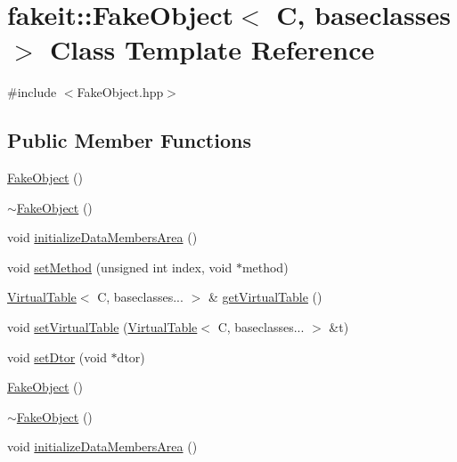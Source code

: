 \hypertarget{classfakeit_1_1FakeObject}{}\section{fakeit\+::Fake\+Object$<$ C, baseclasses $>$ Class Template Reference}
\label{classfakeit_1_1FakeObject}


{\ttfamily \#include $<$Fake\+Object.\+hpp$>$}

\subsection*{Public Member Functions}
\begin{DoxyCompactItemize}
\item 
\mbox{\hyperlink{classfakeit_1_1FakeObject_ad705c5388b4354d1fdeef0bdd0151167}{Fake\+Object}} ()
\item 
\mbox{\hyperlink{classfakeit_1_1FakeObject_abfc9604c62598655fdefcc98a329dbbf}{$\sim$\+Fake\+Object}} ()
\item 
void \mbox{\hyperlink{classfakeit_1_1FakeObject_a894a7e1ef1e41cec0eb91cbb3d5c73cd}{initialize\+Data\+Members\+Area}} ()
\item 
void \mbox{\hyperlink{classfakeit_1_1FakeObject_ad05ea03dec6dc302d6d7b62e47bd1219}{set\+Method}} (unsigned int index, void $\ast$method)
\item 
\mbox{\hyperlink{structfakeit_1_1VirtualTable}{Virtual\+Table}}$<$ C, baseclasses... $>$ \& \mbox{\hyperlink{classfakeit_1_1FakeObject_a28a2c51a5eebcb098d63cc0e4afd2a35}{get\+Virtual\+Table}} ()
\item 
void \mbox{\hyperlink{classfakeit_1_1FakeObject_a541dcdf0dd88facbf2025790c41c1964}{set\+Virtual\+Table}} (\mbox{\hyperlink{structfakeit_1_1VirtualTable}{Virtual\+Table}}$<$ C, baseclasses... $>$ \&t)
\item 
void \mbox{\hyperlink{classfakeit_1_1FakeObject_a8045605042e0351da1e5d81288ae46ec}{set\+Dtor}} (void $\ast$dtor)
\item 
\mbox{\hyperlink{classfakeit_1_1FakeObject_ad705c5388b4354d1fdeef0bdd0151167}{Fake\+Object}} ()
\item 
\mbox{\hyperlink{classfakeit_1_1FakeObject_abfc9604c62598655fdefcc98a329dbbf}{$\sim$\+Fake\+Object}} ()
\item 
void \mbox{\hyperlink{classfakeit_1_1FakeObject_a894a7e1ef1e41cec0eb91cbb3d5c73cd}{initialize\+Data\+Members\+Area}} ()
\item 

\end{DoxyCompactItemize}
